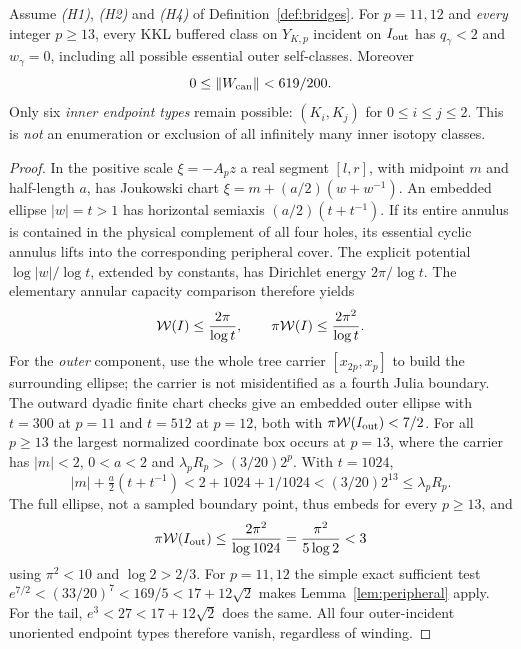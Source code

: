 \begin{theorem}\label{thm:buffer}
Assume \emph{(H1)}, \emph{(H2)} and
\emph{(H4)} of Definition~\ref{def:bridges}.
For $p=11,12$ and
\emph{every} integer $p\ge13$,
every KKL buffered class on
$Y_{K,p}$ incident on
$I_{\rm out}$ has $q_\gamma<2$
and $w_\gamma=0$,
including all possible
essential outer self-classes.
Moreover
\[
 0\le\lVert W_{\rm can}\rVert<619/200.
\]
Only six \emph{inner
endpoint types} remain
possible: $(K_i,K_j)$
for $0\le i\le j\le2$.
This is \emph{not}
an enumeration or exclusion
of all infinitely many
inner isotopy classes.
\end{theorem}
\begin{proof}
In the positive scale
$\xi=-A_pz$ a real segment
$[l,r]$, with midpoint
$m$ and half-length $a$,
has Joukowski chart
$\xi=m+(a/2)(w+w^{-1})$.
An embedded ellipse
$|w|=t>1$ has horizontal
semiaxis $(a/2)(t+t^{-1})$.
If its entire annulus
is contained in the
physical complement
of all four holes,
its essential cyclic
annulus lifts into the
corresponding peripheral
cover.  The explicit
potential $\log|w|/\log t$,
extended by constants,
has Dirichlet energy
$2\pi/\log t$.
The elementary annular
capacity comparison
therefore yields
\begin{equation}\label{eq:collar}
 \mathcal W(I)\le\frac{2\pi}{\log t},
 \qquad \pi\mathcal W(I)\le
 \frac{2\pi^2}{\log t}.
\end{equation}
For the \emph{outer}
component, use the whole
tree carrier
$[x_{2p},x_p]$ to build
the surrounding ellipse;
the carrier is not
misidentified as a
fourth Julia boundary.
The outward dyadic
finite chart checks give
an embedded outer ellipse
with $t=300$ at $p=11$
and $t=512$ at $p=12$,
both with
$\pi\mathcal W(I_{\rm out})<7/2$.
For all $p\ge13$ the
largest normalized
coordinate box occurs at
$p=13$, where the carrier
has $|m|<2$, $0<a<2$ and
$\lambda_pR_p>(3/20)2^p$.
With $t=1024$,
\[
 |m|+\tfrac a2(t+t^{-1})
 <2+1024+1/1024
 <(3/20)2^{13}
 \le\lambda_pR_p.
\]
The full ellipse, not a
sampled boundary point,
thus embeds for every
$p\ge13$, and
\[
 \pi\mathcal W(I_{\rm out})\le
 \frac{2\pi^2}{\log 1024}
 =\frac{\pi^2}{5\log2}<3
\]
using $\pi^2<10$
and $\log2>2/3$.
For $p=11,12$ the
simple exact sufficient
test $e^{7/2}<(33/20)^7
<169/5<17+12\sqrt2$
makes Lemma~\ref{lem:peripheral}
apply.  For the tail,
$e^3<27<17+12\sqrt2$
does the same.  All
four outer-incident
unoriented endpoint
types therefore vanish,
regardless of winding.


\end{proof}
